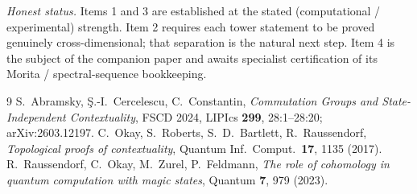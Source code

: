 \documentclass[11pt]{article}
\begin{document}
\noindent\emph{Honest status.} Items 1 and 3 are established at the stated (computational / experimental)
strength. Item 2 requires each tower statement to be proved genuinely cross-dimensional; that separation
is the natural next step. Item 4 is the subject of the companion paper and awaits specialist
certification of its Morita / spectral-sequence bookkeeping.

\begin{thebibliography}{9}
 S.~Abramsky, \c{S}.-I.~Cercelescu, C.~Constantin, \emph{Commutation Groups and
State-Independent Contextuality}, FSCD 2024, LIPIcs \textbf{299}, 28:1--28:20; arXiv:2603.12197.
 C.~Okay, S.~Roberts, S.~D.~Bartlett, R.~Raussendorf, \emph{Topological proofs of
contextuality}, Quantum Inf.\ Comput.\ \textbf{17}, 1135 (2017).
 R.~Raussendorf, C.~Okay, M.~Zurel, P.~Feldmann, \emph{The role of cohomology in quantum
computation with magic states}, Quantum \textbf{7}, 979 (2023).
\end{thebibliography}
\end{document}
